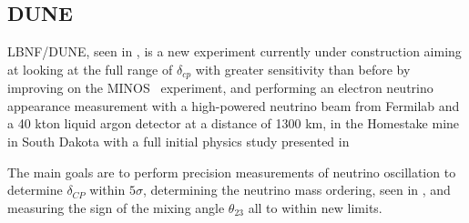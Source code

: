 \subsection{DUNE}
LBNF/DUNE\cite{23DUNE}, seen in , is a new experiment currently under construction aiming at looking at the full range of $\delta_{cp}$ with greater sensitivity than before by improving on the MINOS~\cite{MINOS} experiment, and performing an electron neutrino appearance measurement with a high-powered neutrino beam from Fermilab and a 40 kton liquid argon detector at a distance of 1300 km, in the Homestake mine in South Dakota with a full initial physics study presented in~\cite{76Dune}

The main goals are to perform precision measurements of neutrino oscillation to determine $\delta_{CP}$ within $5\sigma$, determining the neutrino mass ordering, seen in , and measuring the sign of the mixing angle $\theta_{23}$ all to within new limits. 


